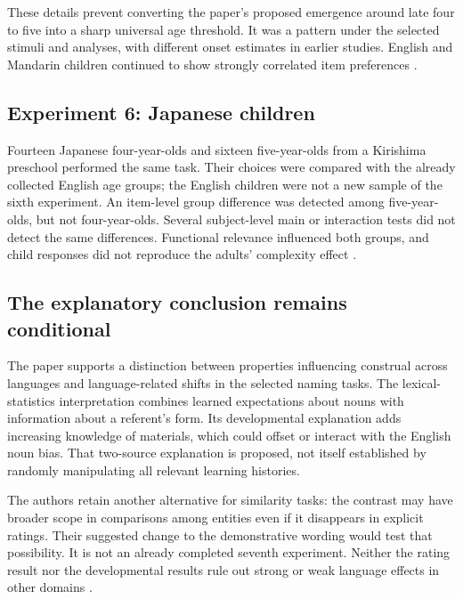 These details prevent converting the paper's proposed emergence around
late four to five into a sharp universal age threshold. It was a pattern
under the selected stimuli and analyses, with different onset estimates
in earlier studies. English and Mandarin children continued to show
strongly correlated item preferences
\cite[pp.~509--514,Figs.~7--8]{LiDunhamCarey2009SubstanceLC}.

\subsection{Experiment 6: Japanese children}

Fourteen Japanese four-year-olds and sixteen five-year-olds from a
Kirishima preschool performed the same task. Their choices were compared
with the already collected English age groups; the English children
were not a new sample of the sixth experiment. An item-level group
difference was detected among five-year-olds, but not four-year-olds.
Several subject-level main or interaction tests did not detect the same
differences. Functional relevance influenced both groups, and child
responses did not reproduce the adults' complexity effect
\cite[pp.~514--516,Figs.~9--10]{LiDunhamCarey2009SubstanceLC}.

\subsection{The explanatory conclusion remains conditional}

The paper supports a distinction between properties influencing construal
across languages and language-related shifts in the selected naming tasks.
The lexical-statistics interpretation combines learned expectations about
nouns with information about a referent's form. Its developmental explanation
adds increasing knowledge of materials, which could offset or interact with
the English noun bias. That two-source explanation is proposed, not itself
established by randomly manipulating all relevant learning histories.

The authors retain another alternative for similarity tasks: the contrast
may have broader scope in comparisons among entities even if it disappears
in explicit ratings. Their suggested change to the demonstrative wording
would test that possibility. It is not an already completed seventh
experiment. Neither the rating result nor the developmental results rule
out strong or weak language effects in other domains
\cite[pp.~517--520]{LiDunhamCarey2009SubstanceLC}.

